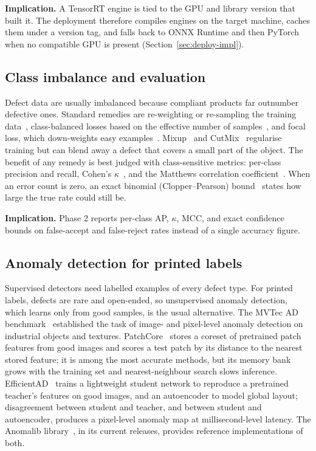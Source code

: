 \noindent\textbf{Implication.} A TensorRT engine is tied to the GPU and library version that built it. The deployment therefore compiles engines on the target machine, caches them under a version tag, and falls back to ONNX Runtime and then PyTorch when no compatible GPU is present (Section~\ref{sec:deploy-impl}).

\subsection{Class imbalance and evaluation}
\label{sec:lit-imb}

Defect data are usually imbalanced because compliant products far outnumber defective ones. Standard remedies are re-weighting or re-sampling the training data~\cite{buda2018}, class-balanced losses based on the effective number of samples~\cite{cui2019}, and focal loss, which down-weights easy examples~\cite{lin2017focal}. Mixup~\cite{zhang2018mixup} and CutMix~\cite{yun2019} regularise training but can blend away a defect that covers a small part of the object. The benefit of any remedy is best judged with class-sensitive metrics: per-class precision and recall, Cohen's $\kappa$~\cite{cohen1960}, and the Matthews correlation coefficient~\cite{chicco2020}. When an error count is zero, an exact binomial (Clopper--Pearson) bound~\cite{clopper1934} states how large the true rate could still be.

\noindent\textbf{Implication.} Phase 2 reports per-class AP, $\kappa$, MCC, and exact confidence bounds on false-accept and false-reject rates instead of a single accuracy figure.

\subsection{Anomaly detection for printed labels}
\label{sec:lit-anom}

Supervised detectors need labelled examples of every defect type. For printed labels, defects are rare and open-ended, so unsupervised anomaly detection, which learns only from good samples, is the usual alternative. The MVTec AD benchmark~\cite{bergmann2019} established the task of image- and pixel-level anomaly detection on industrial objects and textures. PatchCore~\cite{roth2022} stores a coreset of pretrained patch features from good images and scores a test patch by its distance to the nearest stored feature; it is among the most accurate methods, but its memory bank grows with the training set and nearest-neighbour search slows inference. EfficientAD~\cite{batzner2024} trains a lightweight student network to reproduce a pretrained teacher's features on good images, and an autoencoder to model global layout; disagreement between student and teacher, and between student and autoencoder, produces a pixel-level anomaly map at millisecond-level latency. The Anomalib library~\cite{akcay2022}, in its current releases, provides reference implementations of both.

